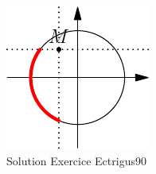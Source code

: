 \begin{figure}[h!]
 \centering
 \includegraphics{Cctrigus90_1.pdf}
 \caption{Solution Exercice Ectrigus90}
 \label{fig:Cctrigus90_1}
\end{figure}


